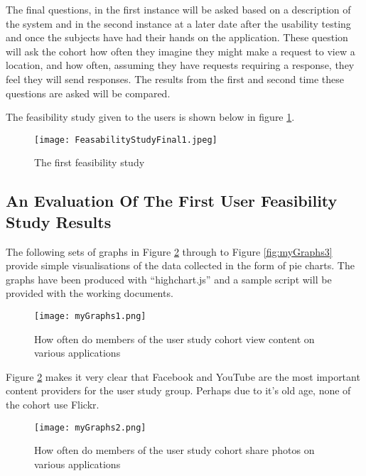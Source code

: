 \documentclass[a4paper]{article}
\begin{document}
The final questions, in the first instance will be asked based on a description of the system and in the second instance at a later date after the usability testing and once the subjects have had their hands on the application. These question will ask the cohort how often they imagine they might make a request to view a location, and how often, assuming they have requests requiring a response, they feel they will send responses. The results from the first and second time these questions are asked will be compared.

The feasibility study given to the users is shown below in figure \ref{fig:userFStudy1}.

\begin{figure}[H]
\centering

\texttt{[image: FeasabilityStudyFinal1.jpeg]}
\caption{The first feasibility study}
\label{fig:userFStudy1}
\end{figure}

\newpage

\subsection{An Evaluation Of The First User Feasibility Study Results }

The following sets of graphs  in  Figure \ref{fig:myGraphs1} through to Figure \ref{fig:myGraphs3} provide simple visualisations of the data collected in the form of pie charts. The graphs have been produced with ``highchart.js'' and a sample script will be provided with the working documents.

\begin{figure}[H]
\centering

\texttt{[image: myGraphs1.png]}
\caption{How often do members of the user study cohort view content on various applications}
\label{fig:myGraphs1}
\end{figure}

 Figure \ref{fig:myGraphs1}  makes it very clear that Facebook and YouTube are the most important content providers for the user study group. Perhaps due to it's old age, none of the cohort use Flickr. 

\begin{figure}[H]
\texttt{[image: myGraphs2.png]}
\caption{How often do members of the user study cohort share photos on various applications}
\label{fig:myGraphs2}
\end{figure}
\end{document}
